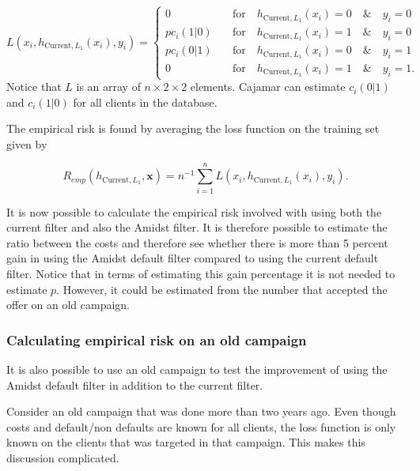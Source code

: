 \documentclass{article}
\theoremstyle{theorem}
\theoremstyle{definition}
\newcommand{\bv}[1]{\bm{#1}}
\begin{document}
{\begin{equation}
\label{def:empRiskBank}
L(x_i, h_{\mbox{Current},L_1}(x_i) , y_i) = 
\begin{cases}
0     &\quad \mbox{for} \quad h_{\mbox{Current},L_1}(x_i) = 0 \quad \& \quad y_i = 0\\
p c_i(1|0)    &\quad \mbox{for} \quad h_{\mbox{Current},L_1}(x_i) = 1 \quad \& \quad y_i = 0\\
p c_i(0|1)      &\quad \mbox{for} \quad h_{\mbox{Current},L_1}(x_i) = 0 \quad \& \quad y_i = 1\\
0   &\quad \mbox{for} \quad h_{\mbox{Current},L_1}(x_i) = 1 \quad \& \quad y_i = 1.
\end{cases}
\end{equation}
Notice that $L$ is an array of $n \times 2\times 2$ elements. Cajamar can estimate $c_i(0|1)$ and $c_i(1|0)$ for all clients in the database.

The empirical risk is found by averaging the loss function on the training set given by 

\begin{equation}
\label{def:empRisk}
R_{emp}(h_{\mbox{Current},L_1}, \bv{x}) = n^{-1} \sum_{i=1}^n L(x_i, h_{\mbox{Current},L_1}(x_i), y_i).
\end{equation}

It is now possible to calculate the empirical risk involved with using both the current filter and also the Amidst filter.  It is therefore possible to estimate the ratio between the costs and therefore see whether there is more than 5 percent gain in using the Amidst default filter compared to using the current default filter.  Notice that in terms of estimating this gain percentage it is not needed to estimate $p$.  However, it could be estimated from the number that accepted the offer on an old campaign.


\subsubsection*{Calculating empirical risk on an old campaign}

It is also possible to use an old campaign to test the improvement of using the Amidst default filter in addition to the current filter. 

Consider an old campaign that was done more than two years ago. Even though costs and default/non defaults are known for all clients, the loss function is only known on the clients that was targeted in that campaign.  This makes this discussion complicated. 

}
\end{document}
